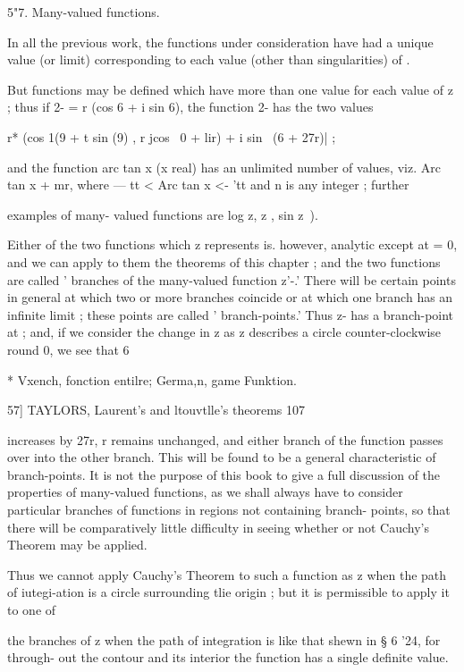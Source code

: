 {{{{5"7. Many-valued functions.

In all the previous work, the functions under consideration have had a
unique value (or limit) corresponding to each value (other than
singularities) of .

But functions may be defined which have more than one value for each
value of z ; thus if 2- = r (cos 6 + i sin 6), the function 2- has the
two values

r* (cos 1(9 + t sin (9) , r jcos \ 0 + lir) + i sin \ (6 + 27r)| ;

and the function arc tan x (x real) has an unlimited number of values,
viz. Arc tan x + mr, where — tt < Arc tan x <- 'tt and n is any
integer ; further

examples of many- valued functions are log z, z , sin z~).

Either of the two functions which z represents is. however, analytic
except at = 0, and we can apply to them the theorems of this chapter ;
and the two functions are called ' branches of the many-valued
function z'-.' There will be certain points in general at which two or
more branches coincide or at which one branch has an infinite limit ;
these points are called ' branch-points.' Thus z- has a branch-point
at ; and, if we consider the change in z as z describes a circle
counter-clockwise round 0, we see that 6

* Vxench, fonction entilre; Germa,n, game Funktion.



57] TAYLORS, Laurent's and ltouvtlle's theorems 107

increases by 27r, r remains unchanged, and either branch of the
function passes over into the other branch. This will be found to be a
general characteristic of branch-points. It is not the purpose of this
book to give a full discussion of the properties of many-valued
functions, as we shall always have to consider particular branches of
functions in regions not containing branch- points, so that there will
be comparatively little difficulty in seeing whether or not Cauchy's
Theorem may be applied.

Thus we cannot apply Cauchy's Theorem to such a function as z when the
path of iutegi-ation is a circle surrounding tlie origin ; but it is
permissible to apply it to one of

the branches of z when the path of integration is like that shewn in §
6 '24, for through- out the contour and its interior the function has
a single definite value.

}}}}
